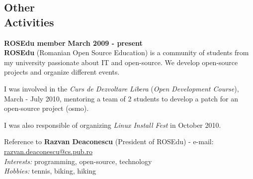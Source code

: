 \documentclass[margin,line]{resume}
\begin{document}
\begin{resume}
    \section{\mysidestyle Other\\Activities}
    \textbf{ROSEdu member} \hfill \textbf{March 2009 - present} \vspace{1mm}\\
	\textbf{ROSEdu} (Romanian Open Source Education) is a community of 
	students from my university passionate about IT and open-source. We develop 
	open-source projects and organize different events.\vspace{1mm}
    \begin{list2}
        \item  I was involved in the \textit{Curs de Dezvoltare Libera} (\textit{Open Development Course}), March - July 2010,
		mentoring a team of 2 students to develop a patch for an open-source project (osmo).
		\item  I was also responsible of organizing \textit{Linux Install Fest} in 	October 2010.
    \end{list2}\vspace{-3mm}
	\small{Reference to \textbf{Razvan Deaconescu} (President of ROSEdu) 
		- e-mail: \href{mailto:razvan.deaconescu@cs.pub.ro}{razvan.deaconescu@cs.pub.ro}} \vspace{2mm}\\
	\textit{Interests:} programming, open-source, technology \vspace{2mm}\\
	\textit{Hobbies:} tennis, biking, hiking
	
    


\end{resume}
\end{document}
